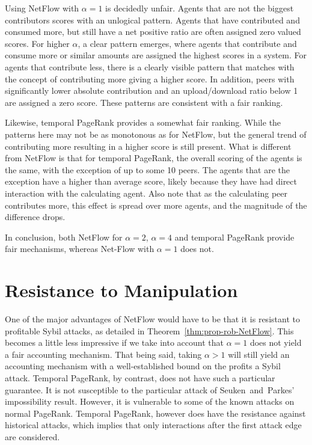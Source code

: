 \documentclass[a4paper,11pt]{book}
\theoremstyle{definition}
\begin{document}
Using NetFlow with $\alpha=1$ is decidedly unfair. 
Agents that are not the biggest contributors scores with an unlogical pattern.
Agents that have contributed and consumed more, but still have a net positive ratio are often assigned
zero valued scores. For higher $\alpha$, a clear pattern emerges, where agents that contribute
and consume more or similar amounts are assigned the highest scores in a system. For agents
that contribute less, there is a clearly visible pattern that matches with the concept of 
contributing more giving a higher score. In addition, peers with significantly lower absolute contribution
and an upload/download ratio below 1 are assigned a zero score. These patterns are consistent with a fair
ranking.

Likewise, temporal PageRank provides a somewhat fair ranking. While the patterns here may not be as
monotonous as for NetFlow, but the general trend of contributing more resulting in a higher score
is still present. What is different from NetFlow is that for temporal PageRank, the overall
scoring of the agents is the same, with the exception of up to some 10 peers. The agents that are
the exception have a higher than average score, likely because they have had direct interaction with
the calculating agent. Also note that as the calculating peer contributes more, this effect is spread
over more agents, and the magnitude of the difference drops. 

In conclusion, both NetFlow for $\alpha=2$, $\alpha=4$ and temporal PageRank provide fair mechanisms, whereas
Net-Flow with $\alpha=1$ does not.

\section{Resistance to Manipulation}

One of the major advantages of NetFlow would have to be that it is resistant to profitable Sybil attacks,
as detailed in Theorem~\ref{thm:prop-rob-NetFlow}. This becomes a little less impressive if we
take into account that $\alpha=1$ does not yield a fair accounting mechanism. That being said, taking
$\alpha > 1$ will still yield an accounting mechanism with a well-established bound on the profits
a Sybil attack. Temporal PageRank, by contrast, does not have such a particular guarantee. It is not
susceptible to the particular attack of Seuken~and~Parkes' impossibility result. However, it is
vulnerable to some of the known attacks on normal PageRank. Temporal PageRank, however does have
the resistance against historical attacks, which implies that only interactions after the
first attack edge are considered.
\end{document}
